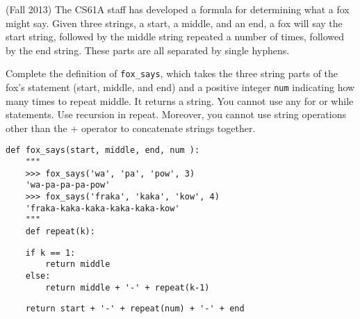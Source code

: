 \question (Fall 2013) The CS61A staff has developed a formula for determining
what a fox might say. Given three strings, a start, a middle, and an end, a fox
will say the start string, followed by the middle string repeated a number of
times, followed by the end string. These parts are all separated by single
hyphens.

Complete the definition of {\tt fox\_says}, which takes the three string parts
of the fox's statement (start, middle, and end) and a positive integer {\tt num}
indicating how many times to repeat middle. It returns a string. You cannot use
any for or while statements. Use recursion in repeat. Moreover, you cannot use
string operations other than the + operator to concatenate strings together.
\begin{lstlisting}
def fox_says(start, middle, end, num ):
    """
    >>> fox_says('wa', 'pa', 'pow', 3)
    'wa-pa-pa-pa-pow'
    >>> fox_says('fraka', 'kaka', 'kow', 4)
    'fraka-kaka-kaka-kaka-kaka-kow'
    """
    def repeat(k):
\end{lstlisting}
\begin{solution}[1.75in]
\begin{lstlisting}
    if k == 1:
        return middle
    else:
        return middle + '-' + repeat(k-1)
\end{lstlisting}
\end{solution}
\begin{lstlisting}
    return start + '-' + repeat(num) + '-' + end
\end{lstlisting}
